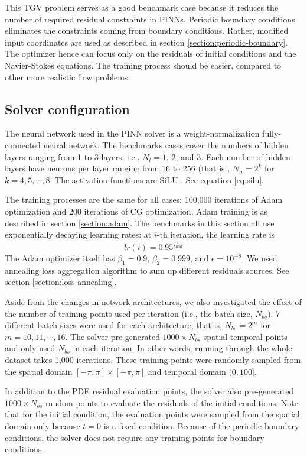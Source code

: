 This TGV problem serves as a good benchmark case because it reduces the number of required residual constraints in PINNs.
Periodic boundary conditions eliminates the constraints coming from boundary conditions.
Rather, modified input coordinates are used as described in section \ref{section:periodic-boundary}.
The optimizer hence can focus only on the residuals of initial conditions and the Navier-Stokes equations.
The training process should be easier, compared to other more realistic flow problems.

\subsection{Solver configuration}

The neural network used in the PINN solver is a weight-normalization fully-connected neural network.
The benchmarks cases cover the numbers of hidden layers ranging from 1 to 3 layers, i.e., $N_l=1$, $2$, and $3$.
Each number of hidden layers have neurons per layer ranging from 16 to 256 (that is , $N_n=2^k$ for $k=4, 5, \cdots, 8$.
The activation functions are SiLU \cite{hendrycks_gaussian_2016}.
See equation \ref{eq:silu}.

The training processes are the same for all cases: 100,000 iterations of Adam optimization and 200 iterations of CG optimization.
Adam training is as described in section \ref{section:adam}.
The benchmarks in this section all use exponentially decaying learning rates: at $i$-th iteration, the learning rate is
\begin{equation}
    lr(i) = 0.95^\frac{i}{5000}
\end{equation}
The Adam optimizer itself has $\beta_1=0.9$, $\beta_2=0.999$, and $\epsilon=10^{-8}$.
We used annealing loss aggregation algorithm to sum up different residuals sources.
See section \ref{section:loss-annealing}.

Aside from the changes in network architectures, we also investigated the effect of the number of training points used per iteration (i.e., the batch size, $N_{bs}$).
7 different batch sizes were used for each architecture, that is, $N_{bs}=2^m$ for $m=10, 11, \cdots, 16$.
The solver pre-generated $1000 \times N_{bs}$ spatial-temporal points and only used $N_{bs}$ in each iteration.
In other words, running through the whole dataset takes 1,000 iterations.
These training points were randomly sampled from the spatial domain $[-\pi, \pi]\times[-\pi, \pi]$ and temporal domain $(0, 100]$.

In addition to the PDE residual evaluation points, the solver also pre-generated $1000 \times N_{bs}$ random points to evaluate the residuals of the initial conditions.
Note that for the initial condition, the evaluation points were sampled from the spatial domain only because $t=0$ is a fixed condition.
Because of the periodic boundary conditions, the solver does not require any training points for boundary conditions.

